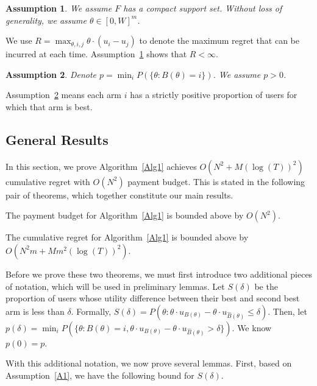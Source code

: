 \documentclass[twoside,11pt]{article}
\newtheorem{assumption}{Assumption}
\begin{document}
\begin{assumption} We assume $F$ has a compact support set. Without loss of generality, we assume $\theta\in [0,W]^m$.
\label{A2}
\end{assumption}

We use $R = \max_{\theta, i,j} \theta \cdot (u_i - u_j)$ to denote the maximum regret that can be incurred at each time.  Assumption~\ref{A2} shows that $R<\infty$.

\begin{assumption}
Denote $p=\min_{i}P(\{\theta: B(\theta)=i\})$. We assume $p>0$.
\label{A3}
\end{assumption}

Assumption~\ref{A3} means each arm $i$ has a strictly positive proportion of users for which that arm is best. 

\subsection{General Results}

In this section, we prove Algorithm~\ref{Alg1} achieves $O(N^2+M(\log(T))^2)$ cumulative regret with $O(N^2)$ payment budget.  This is stated in the following pair of theorems, which together constitute our main results.

\begin{theorem}
The payment budget for Algorithm~\ref{Alg1} is bounded above by $O(N^2)$. 
\label{rst:budget}
\end{theorem}


\begin{theorem}
The cumulative regret for Algorithm~\ref{Alg1} is bounded above by $O(N^2 m + M m^2(\log(T))^2)$.
\label{rst:regret}
\end{theorem}



Before we prove these two theorems, we must first introduce two additional pieces of notation, which will be used in preliminary lemmas.  Let $S(\delta)$ be the proportion of users whose utility difference between their best and second best arm is less than $\delta$. Formally, $S(\delta)=P(\theta: \theta \cdot u_{B(\theta)}-\theta\cdot u_{\hat{B}(\theta)}\leq \delta)$. Then, let $p(\delta)=\min_{i}P(\{\theta:B(\theta)=i,\theta\cdot u_{B(\theta)}-\theta\cdot u_{\hat{B}(\theta)}>\delta\})$. We know $p(0)=p$. 

With this additional notation, we now prove several lemmas.
First, based on Assumption~\ref{A1}, we have the following bound for $S(\delta)$.
\end{document}
